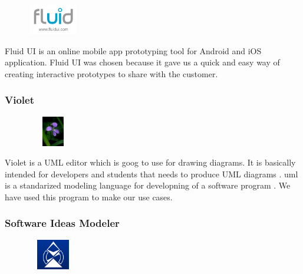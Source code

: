\begin{figure}
  \vspace{-35pt}
  \begin{center}
    \includegraphics[width=0.2\textwidth, height=50px]{fluidui}
  \end{center}

\end{figure}

Fluid UI \cite{bib:fui} is an online mobile app prototyping tool for Android and iOS application. Fluid UI was chosen because it gave us a quick and easy way of creating interactive prototypes to share with the customer.

\pagebreak
\subsubsection{Violet}

\begin{figure}
  \vspace{-35pt}
  \begin{center}
    \includegraphics[width=0.2\textwidth, height=50px]{violet.jpg}
  \end{center}

\end{figure}
Violet is a UML editor which is goog to use for drawing diagrams. It is basically intended for developers and students that needs to produce UML diagrams \cite{bib:violet}. \gls{uml} is a standarized modeling language for developning of a software program \cite{bib:lmu}. We have used this program to make our use cases.

\subsubsection{Software Ideas Modeler}

\begin{figure}
  \vspace{-35pt}
  \begin{center}
    \includegraphics[width=0.2\textwidth, height=50px]{ideasmodeler}
  \end{center}

\end{figure}

